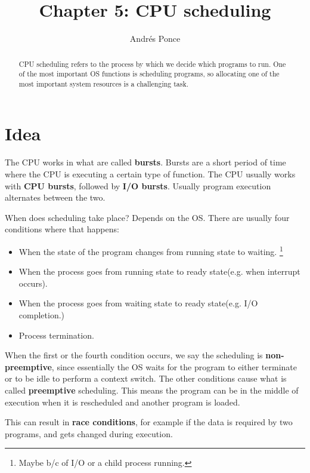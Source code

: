 \documentclass{tufte-handout}
\title{Chapter 5: CPU scheduling}
\author{Andr\'es Ponce}
\begin{document}
\maketitle
\begin{abstract}
CPU scheduling refers to the process by which we decide which
programs to run. One of the most important OS functions is scheduling
programs, so allocating one of the most important system resources
is a challenging task. 
\end{abstract}

\section{Idea}
The CPU works in what are called \textbf{bursts}. Bursts are a short period of time
where the CPU is executing a certain type of function. The CPU usually works with 
\textbf{CPU bursts}, followed by \textbf{I/O bursts}. Usually program execution alternates
between the two.

When does scheduling take place? Depends on the OS. There are usually four conditions where
that happens:
\begin{itemize}
	\item When the state of the program changes from running state to waiting.
	\footnote{Maybe b/c of I/O or a child process running.}
	\item When the process goes from running state to ready state(e.g. when interrupt occurs).
	\item When the process goes from waiting state to ready state(e.g. I/O completion.)
	\item Process termination.
\end{itemize}

When the first or the fourth condition occurs, we say the scheduling is \textbf{non-preemptive},
since essentially the OS waits for the program to either terminate or to be idle to perform 
a context switch. The other conditions cause what is called \textbf{preemptive} scheduling. 
This means the program can be in the middle of execution when it is rescheduled and another
program is loaded.

This can result in \textbf{race conditions}, for example if the data is required by two
programs, and gets changed during execution.
\end{document}
